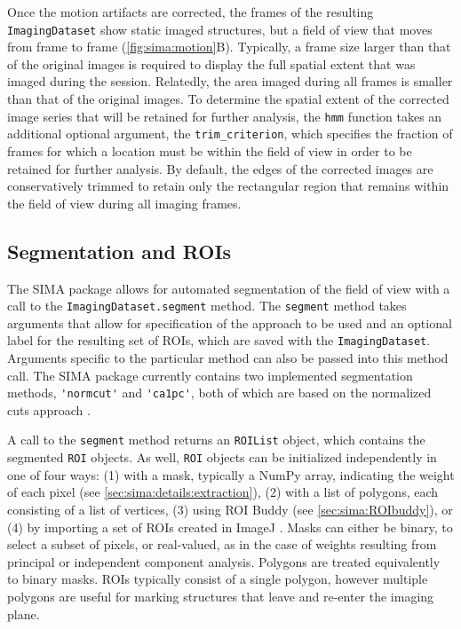 Once the motion artifacts are corrected, the frames of the resulting \verb|ImagingDataset| show static
imaged structures, but a field of view that moves from frame to frame (\autoref{fig:sima:motion}B).
Typically, a frame size larger than that of the original images is required to display
the full spatial extent that was imaged during the session.
Relatedly, the area imaged during all frames is smaller than that of the original
images.
To determine the spatial extent of the corrected image series that will be
retained for further analysis, the \verb|hmm| function takes an additional
optional argument, 
the \verb|trim_criterion|, which specifies the fraction of frames for which
a location must be within the field of view in order to be retained for further
analysis.
By default, the edges of the corrected images are conservatively trimmed to retain
only the rectangular region that remains within the field of view during all imaging frames.

\subsection{Segmentation and ROIs}
\label{sec:sima:ROIs}
The SIMA package allows for automated segmentation of the field of view with a call to the \verb|ImagingDataset.segment|
method.
The \verb|segment| method takes arguments that allow for specification of the approach
to be used and an optional label for the resulting set of ROIs, which are saved
with the \verb|ImagingDataset|.
Arguments specific to the particular method can also be passed into this
method call.
The SIMA package currently contains two implemented segmentation methods,
\verb|'normcut'| and \verb|'ca1pc'|, 
both of which are based on the normalized cuts approach \citep{Shi2000}.

A call to the \verb|segment| method returns an \verb|ROIList| object,
which contains the segmented \verb|ROI| objects.
As well, \verb|ROI| objects can be initialized independently in one of four ways: 
(1) with a mask, typically a NumPy array, indicating the weight of each pixel (see \autoref{sec:sima:details:extraction}),
(2) with a list of polygons, each consisting of a list of vertices,
(3) using ROI Buddy (see \autoref{sec:sima:ROIbuddy}), or
(4) by importing a set of ROIs created in ImageJ \citep{Schneider2012}.
Masks can either be binary, to select a subset of pixels, or real-valued, as in the case of
weights resulting from principal or independent component analysis.
Polygons are treated equivalently to binary masks.
ROIs typically consist of a single polygon, however multiple polygons are useful
for marking structures that leave and re-enter the imaging plane.

